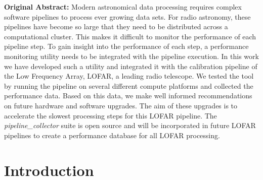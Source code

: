 \setlength\FrameRule{1.5pt}
\begin{frshaded*}
    \textbf{Original Abstract:}
Modern astronomical data processing requires complex software pipelines to process ever growing data sets. For radio astronomy, these pipelines have become so large that they need to be distributed across a computational cluster. This makes it difficult to monitor the performance of each pipeline step. To gain insight into the performance of each  step, a performance monitoring utility needs to be integrated with the pipeline execution. In this work we have developed such a utility and integrated it with the calibration pipeline of the Low Frequency Array, LOFAR, a leading radio telescope. We tested the tool by running the pipeline on several different compute platforms and collected the performance data. Based on this data, we make well informed recommendations on future hardware and software upgrades. The aim of these upgrades is to accelerate the slowest processing steps for this LOFAR pipeline. The \textit{pipeline\_collector} suite is open source and will be incorporated in future LOFAR pipelines to create a performance database for all LOFAR processing. 
\end{frshaded*}






%

\section{\label{sec:ch4_intro}Introduction }
\setcounter{footnote}{0}

